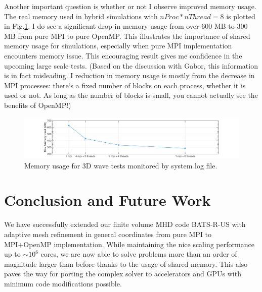 \documentclass[fleqn,11pt]{SelfArx} %
\begin{document}
Another important question is whether or not I observe improved memory usage. The real memory used in hybrid simulations with $nProc*nThread=8$ is plotted in Fig.\ref{fig:memory}. I do see a significant drop in memory usage from over $600$ MB to $300$ MB from pure MPI to pure OpenMP. This illustrates the importance of shared memory usage for simulations, especially when pure MPI implementation encounters memory issue. This encouraging result gives me confidence in the upcoming large scale tests. (Based on the discussion with Gabor, this information is in fact misleading. I reduction in memory usage is mostly from the decrease in MPI processes: there`s a fixed number of blocks on each process, whether it is used or not. As long as the number of blocks is small, you cannot actually see the benefits of OpenMP!)

\begin{figure}
\centering
\includegraphics[width=\textwidth]{figures/memory_usage}
\caption{Memory usage for 3D wave tests monitored by system log file.}
\label{fig:memory}
\end{figure}


\section{Conclusion and Future Work}
We have successfully extended our finite volume MHD code BATS-R-US with adaptive mesh refinement in general coordinates from pure MPI to MPI+OpenMP implementation. While maintaining the nice scaling performance up to $\sim 10^6$ cores, we are now able to solve problems more than an order of magnitude larger than before thanks to the usage of shared memory.
This also paves the way for porting the complex solver to accelerators and GPUs with minimum code modifications possible. 





\end{document}
